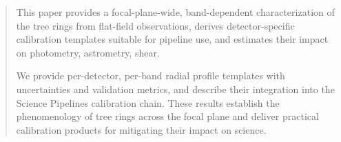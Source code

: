 
\begin{abstract}
This paper provides a focal-plane-wide, band-dependent characterization of the \lsstcam{} tree rings from flat-field observations, derives detector-specific calibration templates suitable for pipeline use, and estimates their impact on photometry, astrometry, shear. 

We provide per-detector, per-band radial profile templates with uncertainties and validation metrics, and describe their integration into the \lsst{} Science Pipelines calibration chain. These results establish the phenomenology of tree rings across the \lsstcam{} focal plane and deliver practical calibration products for mitigating their impact on \lsst{} science.
\end{abstract}
